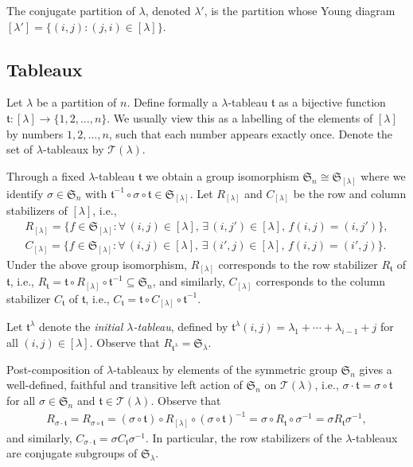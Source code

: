 \documentclass[11pt]{article}
\renewcommand{\t}{\mathfrak{t}}
\newcommand{\TT}{\mathscr{T}}
\newcommand{\sym}[1]{\mathfrak{S}_{#1}}
\begin{document}
The conjugate partition of $\lambda$, denoted $\lambda'$, is the partition whose Young diagram $[\lambda'] = \{ (i,j)\colon (j,i) \in [\lambda] \}$.

\subsection{Tableaux} \label{SS:Tableaux}

Let $\lambda$ be a partition of $n$. Define formally a $\lambda$-tableau $\t$ as a bijective function $\t\colon [\lambda] \to \{1,2,\dotsc,n \}$. We usually view this as a labelling of the elements of $[\lambda]$ by numbers $1,2,\dotsc,n$, such that each number appears exactly once. Denote the set of $\lambda$-tableaux by $\TT(\lambda)$.

Through a fixed $\lambda$-tableau $\t$ we obtain a group isomorphism $\sym{n} \cong \sym{[\lambda]}$ where we identify $\sigma\in\sym{n}$ with $\t^{-1} \circ \sigma \circ \t\in \sym{[\lambda]}$. Let $R_{[\lambda]}$ and $C_{[\lambda]}$ be the row and column stabilizers of $[\lambda]$, i.e.,
\begin{gather*}
R_{[\lambda]}= \{ f \in \sym{[\lambda]}\colon \forall\, (i, j) \in [\lambda],\, \exists\, (i,j')\in [\lambda],\, f(i,j) = (i,j') \}, \\
C_{[\lambda]}= \{ f \in \sym{[\lambda]}\colon \forall\, (i, j) \in [\lambda],\, \exists\, (i',j)\in [\lambda],\, f(i,j) = (i',j) \}.
\end{gather*}
Under the above group isomorphism, $R_{[\lambda]}$ corresponds to the row stabilizer $R_{\t}$ of $\t$, i.e., $R_{\t} = \t \circ R_{[\lambda]} \circ \t^{-1} \subseteq \sym{n}$, and similarly, $C_{[\lambda]}$ corresponds to the column stabilizer $C_{\t}$ of $\t$, i.e., $C_{\t}=\t\circ C_{[\lambda]}\circ \t^{-1}$.

Let $\t^{\lambda}$ denote the \textit{initial $\lambda$-tableau}, defined by $\t^{\lambda}(i,j) = \lambda_1 + \dotsb + \lambda_{i-1} + j$ for all $(i,j) \in [\lambda]$. Observe that $R_{\t^{\lambda}} = \sym{\lambda}$.

Post-composition of $\lambda$-tableaux by elements of the symmetric group $\sym{n}$ gives a well-defined, faithful and transitive left action of $\sym{n}$ on $\TT(\lambda)$, i.e., $\sigma \cdot \t = \sigma \circ \t$ for all $\sigma \in \sym{n}$ and $\t \in \TT(\lambda)$. Observe that \begin{gather*}R_{\sigma \cdot \t} = R_{\sigma \circ \t} = (\sigma \circ \t) \circ R_{[\lambda]} \circ (\sigma \circ \t)^{-1} = \sigma \circ R_{\t} \circ \sigma^{-1} = \sigma R_{\t} \sigma^{-1},\end{gather*} and similarly, $C_{\sigma \cdot \t} = \sigma C_{\t} \sigma^{-1}$. In particular, the row stabilizers of the $\lambda$-tableaux are conjugate subgroups of $\sym{\lambda}$.
\end{document}
